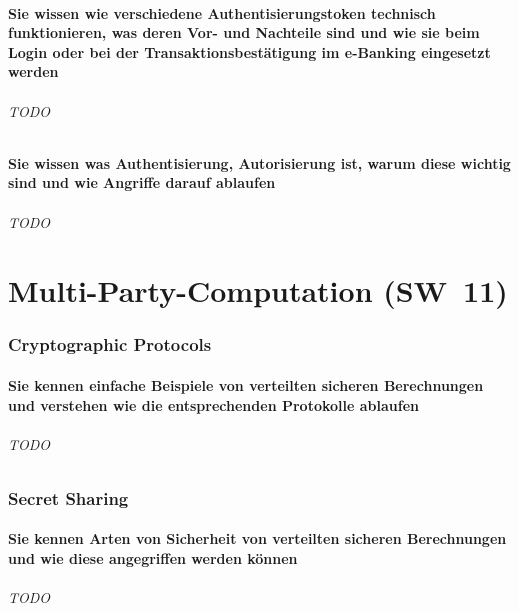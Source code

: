\documentclass[10pt,a4paper]{article}
\begin{document}
\subsection*{Sie wissen wie verschiedene Authentisierungstoken technisch funktionieren, was deren Vor- und Nachteile sind und wie sie beim Login oder bei der Transaktionsbestätigung im e-Banking eingesetzt werden}
\paragraph*{TODO}

\subsection*{Sie wissen was Authentisierung, Autorisierung ist, warum diese wichtig sind und wie Angriffe darauf ablaufen}
\paragraph*{TODO}


\part{Multi-Party-Computation (SW~11)}
\section{Cryptographic Protocols}
\subsection*{Sie kennen einfache Beispiele von verteilten sicheren Berechnungen und verstehen wie die entsprechenden Protokolle ablaufen}
\paragraph*{TODO}

\section{Secret Sharing}
\subsection*{Sie kennen Arten von Sicherheit von verteilten sicheren Berechnungen und wie diese angegriffen werden können}
\paragraph*{TODO}
\end{document}
